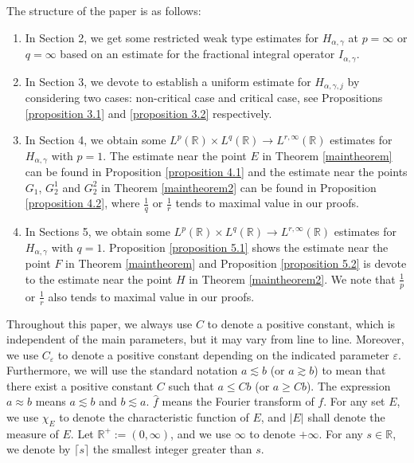 \documentclass[11pt, twoside, leqno]{article}
\def\ls{\lesssim}
\def\gs{\gtrsim}
\theoremstyle{definition}
\numberwithin{equation}{section}
\begin{document}
The structure of the paper is as follows:
\begin{enumerate}
  \item[$\ast$] In Section 2, we get some restricted weak type estimates for $H_{\alpha,\gamma}$ at $p=\infty$ or $q=\infty$ based on an estimate for the fractional integral operator $I_{\alpha,\gamma}$.

  \item[$\ast$] In Section 3, we devote to establish a uniform estimate for $H_{\alpha,\gamma,j}$ by considering two cases: non-critical case and critical case, see Propositions \ref{proposition 3.1} and \ref{proposition 3.2} respectively.

  \item[$\ast$] In Section 4, we obtain some $L^p(\mathbb{R})\times L^q(\mathbb{R}) \rightarrow L^{r,\infty}(\mathbb{R})$ estimates for $H_{\alpha,\gamma}$ with $p=1$. The estimate near the point $E$ in Theorem \ref{maintheorem} can be found in Proposition \ref{proposition 4.1} and the estimate near the points $G_1$, $G_2^1$ and $G_2^2$ in Theorem \ref{maintheorem2} can be found in Proposition \ref{proposition 4.2}, where $\frac{1}{q}$ or $\frac{1}{r}$ tends to maximal value in our proofs.

  \item[$\ast$] In Sections 5, we obtain some $L^p(\mathbb{R})\times L^q(\mathbb{R}) \rightarrow L^{r,\infty}(\mathbb{R})$ estimates for $H_{\alpha,\gamma}$ with $q=1$. Proposition \ref{proposition 5.1} shows the estimate near the point $F$ in Theorem \ref{maintheorem} and Proposition \ref{proposition 5.2} is devote to the estimate near the point $H$ in Theorem \ref{maintheorem2}. We note that $\frac{1}{p}$ or $\frac{1}{r}$ also tends to maximal value in our proofs.
\end{enumerate}

Throughout this paper, we always use $C$ to denote a positive constant, which is independent of the main parameters,
but it may vary from line to line. Moreover, we use $C_{\varepsilon}$ to denote a positive constant depending on the indicated
parameter $\varepsilon$. Furthermore, we will use the standard notation $a\ls b$ (or $a\gs b$) to mean that there exist a positive constant $C$ such that $a\le Cb$ (or $a\ge Cb$). The expression $a\approx b$ means $a\ls b$ and $b\ls a$. $\hat{f}$ means the Fourier transform of $f$. For any set $E$, we use $\chi_E$ to denote the {characteristic function} of $E$, and $|E|$ shall denote the measure of $E$. Let $\mathbb{R}^+:=(0,\infty)$, and we use $\infty$ to denote $+\infty$. For any $s\in \mathbb{R}$, we denote by $\lceil s\rceil$ the smallest integer greater than $s$.
\end{document}
